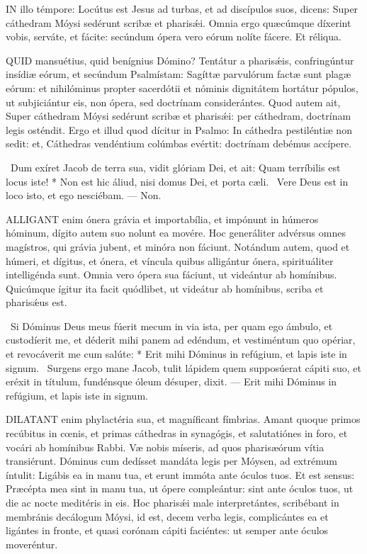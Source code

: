 \lettrine[lines=2]{I}{N} illo témpore: Locútus est Jesus ad turbas, et ad discípulos suos, dicens: Super cáthedram Móysi sedérunt scribæ et pharisǽi. Omnia ergo quæcúmque díxerint vobis, serváte, et fácite: secúndum ópera vero eórum nolíte fácere. Et réliqua.



\lettrine[lines=2]{Q}{UID} mansuétius, quid benígnius Dómino? Tentátur a pharisǽis, confringúntur insídiæ eórum, et secúndum Psalmístam: Sagíttæ parvulórum factæ sunt plagæ eórum: et nihilóminus propter sacerdótii et nóminis dignitátem hortátur pópulos, ut subjiciántur eis, non ópera, sed doctrínam considerántes. Quod autem ait, Super cáthedram Móysi sedérunt scribæ et pharisǽi: per cáthedram, doctrínam legis osténdit. Ergo et illud quod dícitur in Psalmo: In cáthedra pestiléntiæ non sedit: et, Cáthedras vendéntium colúmbas evértit: doctrínam debémus accípere.

\R\ Dum exíret Jacob de terra sua, vidit glóriam Dei, et ait: Quam terríbilis est locus iste! * Non est hic áliud, nisi domus Dei, et porta cæli. \V\ Vere Deus est in loco isto, et ego nesciébam. --- Non.


\lettrine[lines=2]{A}{LLIGANT} enim ónera grávia et importabília, et impónunt in húmeros hóminum, dígito autem suo nolunt ea movére. Hoc generáliter advérsus omnes magístros, qui grávia jubent, et minóra non fáciunt. Notándum autem, quod et húmeri, et dígitus, et ónera, et víncula quibus alligántur ónera, spirituáliter intelligénda sunt. Omnia vero ópera sua fáciunt, ut videántur ab homínibus. Quicúmque ígitur ita facit quódlibet, ut videátur ab homínibus, scriba et pharisǽus est.

\R\ Si Dóminus Deus meus fúerit mecum in via ista, per quam ego ámbulo, et custodíerit me, et déderit mihi panem ad edéndum, et vestiméntum quo opériar, et revocáverit me cum salúte: * Erit mihi Dóminus in refúgium, et lapis iste in signum. \V\ Surgens ergo mane Jacob, tulit lápidem quem supposúerat cápiti suo, et eréxit in títulum, fundénsque óleum désuper, dixit. --- Erit mihi Dóminus in refúgium, et lapis iste in signum.


\lettrine[lines=2]{D}{ILATANT} enim phylactéria sua, et magníficant fímbrias. Amant quoque primos recúbitus in cœnis, et primas cáthedras in synagógis, et salutatiónes in foro, et vocári ab homínibus Rabbi. Væ nobis míseris, ad quos pharisæórum vítia transiérunt. Dóminus cum dedísset mandáta legis per Móysen, ad extrémum íntulit: Ligábis ea in manu tua, et erunt immóta ante óculos tuos. Et est sensus: Præcépta mea sint in manu tua, ut ópere compleántur: sint ante óculos tuos, ut die ac nocte meditéris in eis. Hoc pharisǽi male interpretántes, scribébant in membránis decálogum Móysi, id est, decem verba legis, complicántes ea et ligántes in fronte, et quasi corónam cápiti faciéntes: ut semper ante óculos moveréntur.

